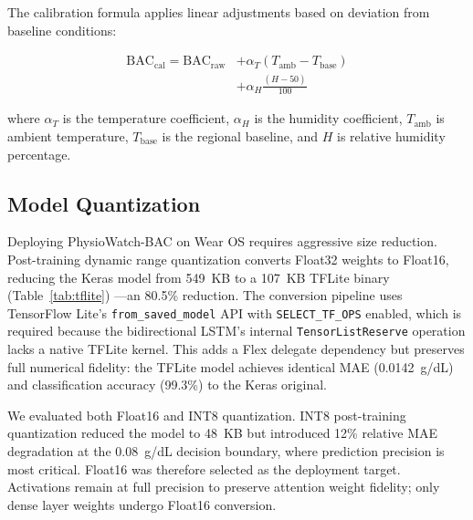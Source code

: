 \documentclass[HARVARD,Times2COL]{WileyNJDv5} %
\providecommand{\DIFadd}[1]{{\protect\color{red} #1}} %
\providecommand{\DIFdel}[1]{} %
\providecommand{\DIFaddbegin}{} %
\providecommand{\DIFaddend}{} %
\providecommand{\DIFdelbegin}{} %
\providecommand{\DIFdelend}{} %
\providecommand{\DIFscaledelfig}{0.5}
\newlength{\DIFdelgraphicswidth} %
\newlength{\DIFdelgraphicsheight} %
\providecommand{\DIFaddincludegraphics}[2][]{{\color{blue}\fbox{\DIFOincludegraphics[#1]{#2}}}} %
\providecommand{\DIFdelincludegraphics}[2][]{%
\sbox{\DIFdelgraphicsbox}{\DIFOincludegraphics[#1]{#2}}%
\settoboxwidth{\DIFdelgraphicswidth}{\DIFdelgraphicsbox} %
\settoboxtotalheight{\DIFdelgraphicsheight}{\DIFdelgraphicsbox} %
\scalebox{\DIFscaledelfig}{%
\parbox[b]{\DIFdelgraphicswidth}{\usebox{\DIFdelgraphicsbox}\\[-\baselineskip] \rule{\DIFdelgraphicswidth}{0em}}\llap{\resizebox{\DIFdelgraphicswidth}{\DIFdelgraphicsheight}{%
\setlength{\unitlength}{\DIFdelgraphicswidth}%
\begin{picture}(1,1)%
\thicklines\linethickness{2pt} %
{\color[rgb]{1,0,0}\put(0,0){\framebox(1,1){}}}%
{\color[rgb]{1,0,0}\put(0,0){\line( 1,1){1}}}%
{\color[rgb]{1,0,0}\put(0,1){\line(1,-1){1}}}%
\end{picture}%
}\hspace*{3pt}}} %
} %
\DeclareRobustCommand{\DIFaddbegin}{\DIFOaddbegin \let\includegraphics\DIFaddincludegraphics} %
\DeclareRobustCommand{\DIFaddend}{\DIFOaddend \let\includegraphics\DIFOincludegraphics} %
\DeclareRobustCommand{\DIFdelbegin}{\DIFOdelbegin \let\includegraphics\DIFdelincludegraphics} %
\DeclareRobustCommand{\DIFdelend}{\DIFOaddend \let\includegraphics\DIFOincludegraphics} %
\begin{document}
The calibration formula applies linear adjustments based on deviation from baseline conditions:

\begin{equation}
\begin{split}
\text{BAC}_{\text{cal}} = \text{BAC}_{\text{raw}} &+ \alpha_T (T_{\text{amb}} - T_{\text{base}}) \\
&+ \alpha_H \frac{(H - 50)}{100}
\end{split}
\end{equation}

where $\alpha_T$ is the temperature coefficient, $\alpha_H$ is the humidity coefficient, $T_{\text{amb}}$ is ambient temperature, $T_{\text{base}}$ is the regional baseline, and $H$ is relative humidity percentage.

\subsection{Model Quantization}\DIFaddbegin \label{sec:quantization}
\DIFaddend Deploying PhysioWatch-BAC on Wear OS requires aggressive size reduction. Post-training dynamic range quantization converts Float32 weights to Float16, \DIFdelbegin \DIFdel{shrinking the model from 1.2 MB to 22 KB }\DIFdelend \DIFaddbegin \DIFadd{reducing the Keras model from 549~KB to a 107~KB TFLite binary }\DIFaddend (Table~\ref{tab:tflite})\DIFdelbegin \DIFdel{---a 98.2\% reductionenabling storage in on-chip flash. }\DIFdelend \DIFaddbegin \DIFadd{---an 80.5\% reduction. The conversion pipeline uses TensorFlow Lite's \texttt{from\_saved\_model} API with \texttt{SELECT\_TF\_OPS} enabled, which is required because the bidirectional LSTM's internal \texttt{TensorListReserve} operation lacks a native TFLite kernel. This adds a Flex delegate dependency but preserves full numerical fidelity: the TFLite model achieves identical MAE (0.0142~g/dL) and classification accuracy (99.3\%) to the Keras original.
}\DIFaddend 

\DIFaddbegin \DIFadd{We evaluated both Float16 and INT8 quantization. INT8 post-training quantization reduced the model to 48~KB but introduced 12\% relative MAE degradation at the 0.08~g/dL decision boundary, where prediction precision is most critical. Float16 was therefore selected as the deployment target. Activations remain at full precision to preserve attention weight fidelity; only dense layer weights undergo Float16 conversion.
}
\end{document}
